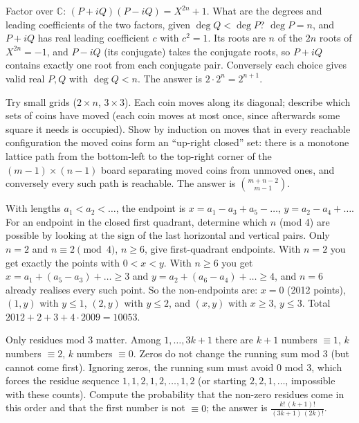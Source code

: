 \documentclass[11pt,a4paper]{article}
\begin{document}
Factor over \(\mathbb C\): \((P+iQ)(P-iQ)=X^{2n}+1\). What are the degrees and leading coefficients of the two factors, given \(\deg Q\lt\deg P\)?
\(\deg P=n\), and \(P+iQ\) has real leading coefficient \(c\) with \(c^2=1\). Its roots are \(n\) of the \(2n\) roots of \(X^{2n}=-1\), and \(P-iQ\) (its conjugate) takes the conjugate roots, so \(P+iQ\) contains exactly one root from each conjugate pair. Conversely each choice gives valid real \(P,Q\) with \(\deg Q\lt n\). The answer is \(2\cdot2^n=2^{n+1}\).

Try small grids (\(2\times n\), \(3\times3\)). Each coin moves along its diagonal; describe which sets of coins have moved (each coin moves at most once, since afterwards some square it needs is occupied).
Show by induction on moves that in every reachable configuration the moved coins form an ``up-right closed'' set: there is a monotone lattice path from the bottom-left to the top-right corner of the \((m-1)\times(n-1)\) board separating moved coins from unmoved ones, and conversely every such path is reachable. The answer is \(\binom{m+n-2}{m-1}\).

With lengths \(a_1\lt a_2\lt\dots\), the endpoint is \(x=a_1-a_3+a_5-\dots\), \(y=a_2-a_4+\dots\). For an endpoint in the closed first quadrant, determine which \(n\) (mod 4) are possible by looking at the sign of the last horizontal and vertical pairs.
Only \(n=2\) and \(n\equiv2\pmod4\), \(n\ge6\), give first-quadrant endpoints. With \(n=2\) you get exactly the points with \(0\lt x\lt y\). With \(n\ge6\) you get \(x=a_1+(a_5-a_3)+\dots\ge3\) and \(y=a_2+(a_6-a_4)+\dots\ge4\), and \(n=6\) already realises every such point.
So the non-endpoints are: \(x=0\) (2012 points), \((1,y)\) with \(y\le1\), \((2,y)\) with \(y\le2\), and \((x,y)\) with \(x\ge3\), \(y\le3\). Total \(2012+2+3+4\cdot2009=10053\).

Only residues mod 3 matter. Among \(1,\dots,3k+1\) there are \(k+1\) numbers \(\equiv1\), \(k\) numbers \(\equiv2\), \(k\) numbers \(\equiv0\). Zeros do not change the running sum mod 3 (but cannot come first).
Ignoring zeros, the running sum must avoid \(0\) mod 3, which forces the residue sequence \(1,1,2,1,2,\dots,1,2\) (or starting \(2,2,1,\dots\), impossible with these counts). Compute the probability that the non-zero residues come in this order and that the first number is not \(\equiv0\); the answer is \(\frac{k!\,(k+1)!}{(3k+1)\,(2k)!}\).
\end{document}
